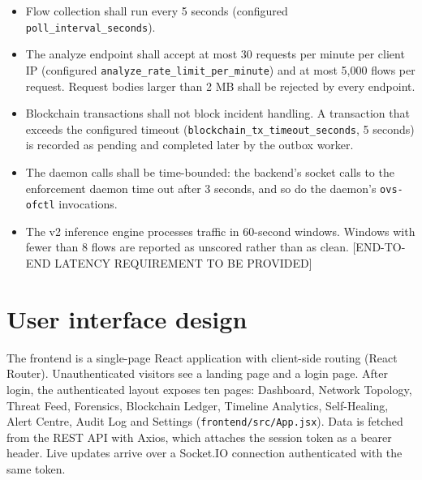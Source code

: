 \documentclass[12pt,a4paper]{report}
\begin{document}
\begin{itemize}
    \item {Flow collection shall run every 5 seconds (configured \texttt{poll\_interval\_seconds}).}

    \item {The analyze endpoint shall accept at most 30 requests per minute per client IP (configured \texttt{analyze\_rate\_limit\_per\_minute}) and at most 5{,}000 flows per request. Request bodies larger than 2 MB shall be rejected by every endpoint.}

    \item {Blockchain transactions shall not block incident handling. A transaction that exceeds the configured timeout (\texttt{blockchain\_tx\_timeout\_seconds}, 5 seconds) is recorded as pending and completed later by the outbox worker.}

    \item {The daemon calls shall be time-bounded: the backend's socket calls to the enforcement daemon time out after 3 seconds, and so do the daemon's \texttt{ovs-ofctl} invocations.}

    \item {The v2 inference engine processes traffic in 60-second windows. Windows with fewer than 8 flows are reported as unscored rather than as clean. [END-TO-END LATENCY REQUIREMENT TO BE PROVIDED]}
\end{itemize}

\section{User interface design}
\par
The frontend is a single-page React application with client-side routing (React Router). Unauthenticated visitors see a landing page and a login page. After login, the authenticated layout exposes ten pages: Dashboard, Network Topology, Threat Feed, Forensics, Blockchain Ledger, Timeline Analytics, Self-Healing, Alert Centre, Audit Log and Settings (\texttt{frontend/src/App.jsx}). Data is fetched from the REST API with Axios, which attaches the session token as a bearer header. Live updates arrive over a Socket.IO connection authenticated with the same token.
\end{document}
